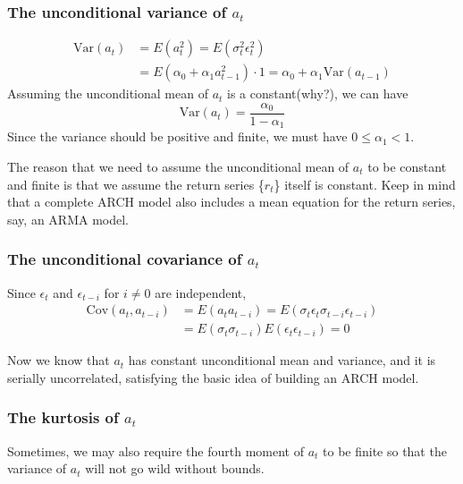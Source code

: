 \documentclass[a4paper,11pt]{article}
\newcommand{\var}{\mathrm{Var}}
\newcommand{\cov}{\mathrm{Cov}}
\begin{document}
\subsubsection*{The unconditional variance of \(a_t\)}
\label{sec:org2566500}

\begin{equation*}
\begin{split}
\var(a_t) &= E(a^2_t) = E(\sigma^2_t \epsilon^2_t) \\
&= E(\alpha_0 + \alpha_1 a^2_{t-1}) \cdot 1 = \alpha_0 + \alpha_1\var(a_{t-1})
\end{split}
\end{equation*}
Assuming the unconditional mean of \(a_t\) is a constant(why?), we can
have 
\[\var(a_t) = \frac{\alpha_0}{1-\alpha_1} \]
Since the variance should be positive and finite, we must have \(0 \leq
\alpha_1 < 1\). 

The reason that we need to assume the unconditional mean of \(a_t\) to
be constant and finite is that we assume the return series \{\(r_t\)\}
itself is constant. Keep in mind that a complete ARCH model also
includes a mean equation for the return series, say, an ARMA model. 

\subsubsection*{The unconditional covariance of \(a_t\)}
\label{sec:org5cabc29}

Since \(\epsilon_t\) and \(\epsilon_{t-i}\) for \(i \neq 0\) are independent, 
\begin{equation*}
\begin{split}
\cov(a_t, a_{t-i}) &= E(a_t a_{t-i}) = E(\sigma_t \epsilon_t \sigma_{t-i} \epsilon_{t-i}) \\
&= E(\sigma_t \sigma_{t-i}) E(\epsilon_t \epsilon_{t-i}) = 0
\end{split}
\end{equation*}

Now we know that \(a_t\) has constant unconditional mean and variance,
and it is serially uncorrelated, satisfying the basic idea of building
an ARCH model.

\subsubsection*{The kurtosis of \(a_t\)}
\label{sec:orge40092f}

Sometimes, we may also require the fourth moment of \(a_t\) to be finite
so that the variance of \(a_t\) will not go wild without bounds. 
\end{document}
